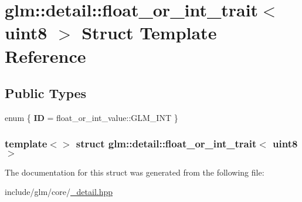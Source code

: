 \hypertarget{structglm_1_1detail_1_1float__or__int__trait_3_01uint8_01_4}{\section{glm\-:\-:detail\-:\-:float\-\_\-or\-\_\-int\-\_\-trait$<$ uint8 $>$ \-Struct \-Template \-Reference}
\label{structglm_1_1detail_1_1float__or__int__trait_3_01uint8_01_4}
}
\subsection*{\-Public \-Types}
\begin{DoxyCompactItemize}
\item 
enum \{ {\bfseries \-I\-D} =  float\-\_\-or\-\_\-int\-\_\-value\-:\-:\-G\-L\-M\-\_\-\-I\-N\-T
 \}
\end{DoxyCompactItemize}
\subsubsection*{template$<$$>$ struct glm\-::detail\-::float\-\_\-or\-\_\-int\-\_\-trait$<$ uint8 $>$}



\-The documentation for this struct was generated from the following file\-:\begin{DoxyCompactItemize}
\item 
include/glm/core/\hyperlink{__detail_8hpp}{\-\_\-detail.\-hpp}\end{DoxyCompactItemize}
